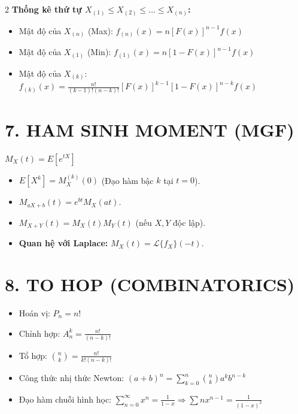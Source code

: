 \documentclass[8pt,a4paper]{article}
\begin{document}
\begin{multicols*}{2}
\textbf{Thống kê thứ tự $X_{(1)} \leq X_{(2)} \leq \dots \leq X_{(n)}$:}
\begin{itemize}
    \item Mật độ của $X_{(n)}$ (Max): $f_{(n)}(x) = n [F(x)]^{n-1} f(x)$
    \item Mật độ của $X_{(1)}$ (Min): $f_{(1)}(x) = n [1 - F(x)]^{n-1} f(x)$
    \item Mật độ của $X_{(k)}$: $f_{(k)}(x) = \frac{n!}{(k-1)!(n-k)!} [F(x)]^{k-1} [1-F(x)]^{n-k} f(x)$
\end{itemize}

\section{7. HAM SINH MOMENT (MGF)}
$M_X(t) = E[e^{tX}]$
\begin{itemize}
    \item $E[X^k] = M_X^{(k)}(0)$ (Đạo hàm bậc $k$ tại $t=0$).
    \item $M_{aX+b}(t) = e^{bt} M_X(at)$.
    \item $M_{X+Y}(t) = M_X(t) M_Y(t)$ (nếu $X, Y$ độc lập).
    \item \textbf{Quan hệ với Laplace:} $M_X(t) = \mathcal{L}\{f_X\}(-t)$.
\end{itemize}

\section{8. TO HOP (COMBINATORICS)}
\begin{itemize}
    \item Hoán vị: $P_n = n!$
    \item Chỉnh hợp: $A_n^k = \frac{n!}{(n-k)!}$
    \item Tổ hợp: $\binom{n}{k} = \frac{n!}{k!(n-k)!}$
    \item Công thức nhị thức Newton: $(a+b)^n = \sum_{k=0}^n \binom{n}{k} a^k b^{n-k}$
    \item Đạo hàm chuỗi hình học: $\sum_{n=0}^\infty x^n = \frac{1}{1-x} \Rightarrow \sum n x^{n-1} = \frac{1}{(1-x)^2}$
\end{itemize}

\end{multicols*}

\pagebreak
\end{document}
